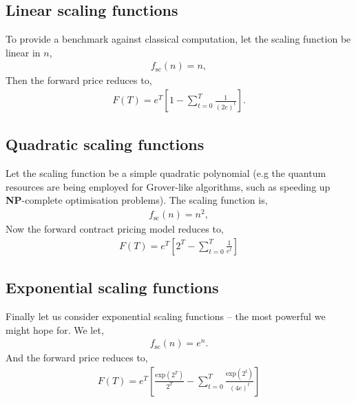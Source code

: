 \documentclass[aps,pra,twocolumn,amsmath,amssymb,nofootinbib,superscriptaddress]{revtex4}
\begin{document}
%
%

\subsection{Linear scaling functions}

To provide a benchmark against classical computation, let the scaling function be linear in $n$,
\begin{align}
f_\text{sc}(n) = n,	
\end{align}
Then the forward price reduces to,
\begin{align}
F(T) = e^{T}\left[ 1 - \sum_{t=0}^T \frac{1}{(2e)^t}\right].
\end{align}

%
%

\subsection{Quadratic scaling functions}

Let the scaling function be a simple quadratic polynomial (e.g the quantum resources are being employed for Grover-like algorithms, such as speeding up \textbf{NP}-complete optimisation problems). The scaling function is,
\begin{align}
f_\text{sc}(n) = n^2,	
\end{align}
Now the forward contract pricing model reduces to,
\begin{align}
F(T) = e^{T}\left[ 2^{T} - \sum_{t=0}^T \frac{1}{e^t}\right]
\end{align}

%
%

\subsection{Exponential scaling functions}

Finally let us consider exponential scaling functions -- the most powerful we might hope for. We let,
\begin{align}
f_\text{sc}(n) = e^n.	
\end{align}
And the forward price reduces to,
\begin{align}
F(T) = e^{T}\left[ \frac{\text{exp}(2^{T})}{2^T} - \sum_{t=0}^T \frac{\text{exp}(2^{t})}{(4e)^t}\right]
\end{align}
\end{document}
